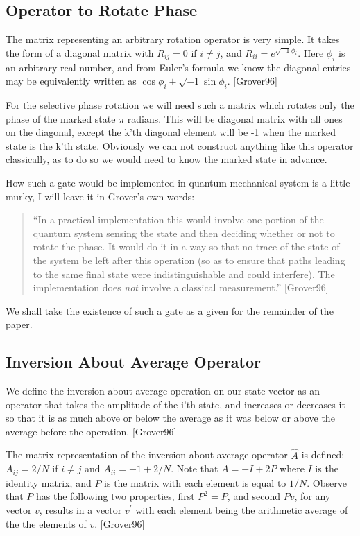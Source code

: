 \documentclass[]{article}
\begin{document}
\subsection{Operator to Rotate Phase}

The matrix representing an arbitrary rotation operator is very simple.
It takes the form of a diagonal matrix with $R_{ij} = 0$ if $ i \not =
j$, and $R_{ii} = e^{\sqrt{-1}\phi_{i}}$.  Here $\phi_{i}$ is an
arbitrary real number, and from Euler's formula we know the diagonal
entries may be equivalently written as $\cos{\phi_{i}} + \sqrt{-1}\sin{\phi_{i}}$. [Grover96]
	
For the selective phase rotation we will need such a matrix which
rotates only the phase of the marked state $\pi$ radians.  This will
be diagonal matrix with all ones on the diagonal, except the k'th
diagonal element will be -1 when the marked state is the k'th state.
Obviously we can not construct anything like this operator
classically, as to do so we would need to know the marked state in
advance.

How such a gate would be implemented in quantum mechanical system is a
little murky, I will leave it in Grover's own words: 

\begin{quote}
``In a practical implementation this would involve one portion of the
quantum system sensing the state and then deciding whether or not to
rotate the phase.  It would do it in a way so that no trace of the
state of the system be left after this operation (so as to ensure that
paths leading to the same final state were indistinguishable and could
interfere).  The implementation does \emph{not} involve a classical
measurement.'' [Grover96]
\end{quote}

We shall take the existence of such a gate as a given for the
remainder of the paper.

\subsection{Inversion About Average Operator}

We define the inversion about average operation on our state vector as
an operator that takes the amplitude of the i'th state, and increases
or decreases it so that it is as much above or below the average as it
was below or above the average before the operation. [Grover96]

The matrix representation of the inversion about average operator
$\hat{A}$ is defined: $A_{ij} = 2/N$ if $i \not = j$ and $A_{ii} = -1
+ 2/N$.  Note that $A = -I + 2P$ where $I$ is the identity matrix, and
$P$ is the matrix with each element is equal to $1/N$.  Observe that
$P$ has the following two properties, first $P^{2} = P$, and second
$Pv$, for any vector $v$, results in a vector $v^{'}$ with each
element being the arithmetic average of the the elements of
$v$. [Grover96]
\end{document}
